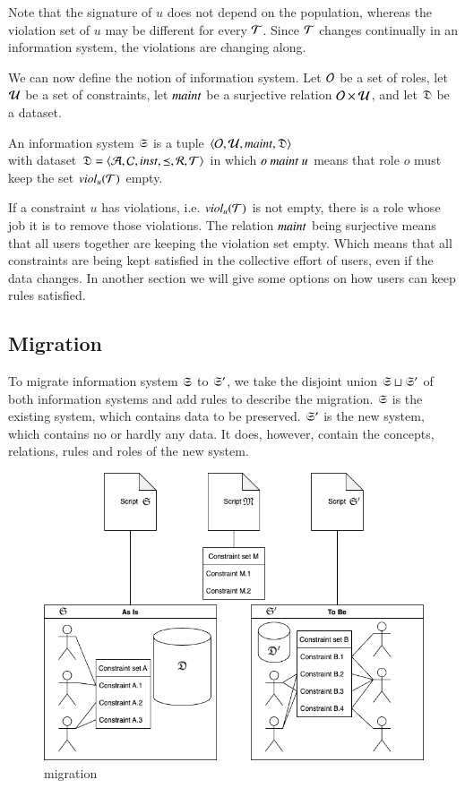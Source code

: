 \documentclass{elsarticle}
\begin{document}
	Note that the signature of $u$ does not depend on the population, whereas the violation set of $u$ may be different for every $\mathcal{T}$.
	Since $\mathcal{T}$ changes continually in an information system, the violations are changing along. 

	We can now define the notion of information system.
	Let $\mathcal{O}$ be a set of roles,
	let $\mathcal{U}$ be a set of constraints, 
	let $\text{\it maint\/}$ be a surjective relation $\mathcal{O}\times\mathcal{U}$,
	and let $\mathfrak{D}$ be a dataset.
\begin{definition}
	\label{def:information system}
	\item An information system $\mathfrak{S}$ is a tuple $\langle\mathcal{O},\mathcal{U},\text{\it maint\/},\mathfrak{D}\rangle$\\
	with dataset $\mathfrak{D}=\langle\mathcal{A},\mathcal{C},\text{\it inst\/},\preceq,\mathcal{R},\mathcal{T}\rangle$
	in which $o\ \text{\it maint\/}\ u$ means that role $o$ must keep the set $\text{\it viol\/}_{u}(\mathcal{T})$ empty.
\end{definition}
	If a constraint $u$ has violations, i.e. $\text{\it viol\/}_{u}(\mathcal{T})$ is not empty, there is a role whose job it is to remove those violations.
	The relation $\text{\it maint\/}$ being surjective means that all users together are keeping the violation set empty.
	Which means that all constraints are being kept satisfied in the collective effort of users, even if the data changes.
	In another section we will give some options on how users can keep rules satisfied.

\subsection{Migration}
	To migrate information system $\mathfrak{S}$ to $\mathfrak{S}'$, we take the disjoint union $\mathfrak{S}\sqcup\mathfrak{S}'$ of both information systems
	and add rules to describe the migration.
	$\mathfrak{S}$ is the existing system, which contains data to be preserved.
	$\mathfrak{S}'$ is the new system, which contains no or hardly any data.
	It does, however, contain the concepts, relations, rules and roles of the new system.
\begin{figure}[bht]
	\begin{center}
	  \includegraphics[scale=.45]{Migration.drawio.png}
	\end{center}
\caption{migration}
\label{fig:event flow}
\end{figure}
		
\end{document}
